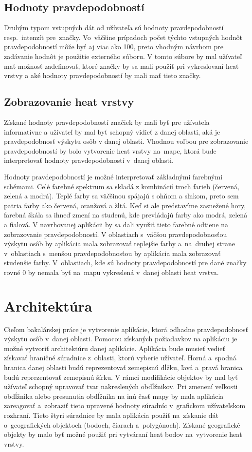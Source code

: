 \subsection*{Hodnoty pravdepodobností}
Druhým typom vstupných dát od užívateľa sú hodnoty pravdepodobností resp.~intenzít pre~značky. Vo~väčšine prípadoch počet týchto vstupných hodnôt pravdepodobností môže byť aj viac ako 100, preto vhodným návrhom pre zadávanie hodnôt je použitie externého súboru. V tomto súbore by mal užívateľ mať možnosť zadefinovať, ktoré značky by sa mali použiť pri vykresľovaní heat vrstvy a aké hodnoty pravdepodobností by mali mať tieto značky.

\subsection*{Zobrazovanie heat vrstvy}
Získané hodnoty pravdepodobností značiek by mali byť pre užívateľa informatívne a užívateľ by mal byť schopný vidieť z danej oblasti, aká je pravdepodobnosť výskytu osôb v danej oblasti. Vhodnou voľbou pre zobrazovanie pravdepodobností by bolo vytvorenie heat vrstvy na~mape, ktorá bude interpretovať hodnoty pravdepodobností v~danej oblasti.

Hodnoty pravdepodobností je možné interpretovať základnými farebnými schémami. Celé farebné spektrum sa skladá z kombinácií troch farieb (červená, zelená a modrá). Teplé farby sa väčšinou spájajú s ohňom a slnkom, preto sem patria farby ako červená, oranžová a žltá. Keď si ale predstavíme zasnežené hory, farebná škála sa ihneď zmení na studenú, kde prevládajú farby ako modrá, zelená a fialová. V navrhovanej aplikácii by sa dali využiť tieto farebné odtiene na zobrazovanie pravdepodobností. V oblastiach s~väčšou pravdepodobnosťou výskytu osôb by aplikácia mala zobrazovať teplejšie farby a~na~druhej strane v~oblastiach s~menšou pravdepodobnosťou by aplikácia mala zobrazovať studenšie farby. V~oblastiach, kde sú hodnoty pravdepodobností pre dané značky rovné $0$ by nemala byť na~mapu vykreslená v~danej oblasti heat vrstva.


\section{Architektúra}
Cieľom bakalárskej práce je vytvorenie aplikácie, ktorá odhadne pravdepodobnosť výskytu osôb v~danej oblasti. Pomocou získaných požiadavkov na aplikáciu je možné vytvoriť architektúru danej aplikácie. Aplikácia bude musieť vedieť získavať hraničné súradnice z~oblasti, ktorú vyberie užívateľ. Horná a~spodná hranica  danej oblasti budú reprezentovať zemepisnú dĺžku, ľavá a~pravá hranica budú reprezentovať zemepisnú šírku. V rámci modifikácie objektov by mal byť užívateľ schopný upravovať tvar nakreslených obdĺžnikov. Pri zmenení veľkosti obdĺžnika alebo presunutia obdĺžnika na inú časť mapy by mala aplikácia zareagovať a~zobraziť tieto upravené hodnoty súradníc v~grafickom užívateľskom rozhraní. Tieto štyri súradnice by mala aplikácia použiť na~získanie dát o~geografických objektoch (bodoch, čiarach a~polygónoch). Získané geografické objekty by malo byť možné použiť pri vytváraní heat bodov na~vytvorenie heat vrstvy. 



